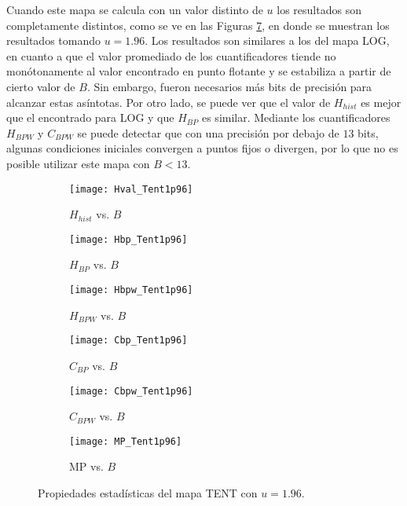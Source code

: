 Cuando este mapa se calcula con un valor distinto de $u$ los resultados son completamente distintos, como se ve en las Figuras \ref{fig:TENT1p96_QuantiB}, en donde se muestran los resultados tomando $u=1.96$.
Los resultados son similares a los del mapa LOG, en cuanto a que el valor promediado de los cuantificadores tiende no monótonamente al valor encontrado en punto flotante y se estabiliza a partir de cierto valor de $B$.
Sin embargo, fueron necesarios más bits de precisión para alcanzar estas asíntotas.
Por otro lado, se puede ver que el valor de $H_{hist}$ es mejor que el encontrado para LOG y que $H_{BP}$ es similar.
Mediante los cuantificadores $H_{BPW}$ y $C_{BPW}$ se puede detectar que con una precisión por debajo de $13$ bits, algunas condiciones iniciales convergen a puntos fijos o divergen, por lo que no es posible utilizar este mapa con $B < 13$.
%
\begin{figure}[htpb]
	\centering
	\begin{subfigure}[b]{0.49\textwidth}
		\texttt{[image: Hval\_Tent1p96]}
		\caption{$H_{hist}$ vs. $B$}
		\label{fig:Hval_Tent1p96}
	\end{subfigure}
	\begin{subfigure}[b]{0.49\textwidth}
		\texttt{[image: Hbp\_Tent1p96]}
		\caption{$H_{BP}$ vs. $B$}
		\label{fig:Hbp_Tent1p96}
	\end{subfigure}
	\begin{subfigure}[b]{0.49\textwidth}
		\texttt{[image: Hbpw\_Tent1p96]}
		\caption{$H_{BPW}$ vs. $B$}
		\label{fig:Hbpw_Tent1p96}
	\end{subfigure}
	\begin{subfigure}[b]{0.49\textwidth}
		\texttt{[image: Cbp\_Tent1p96]}
		\caption{$C_{BP}$ vs. $B$}
		\label{fig:Cbp_Tent1p96}
	\end{subfigure}
	\begin{subfigure}[b]{0.49\textwidth}
		\texttt{[image: Cbpw\_Tent1p96]}
		\caption{$C_{BPW}$ vs. $B$}
		\label{fig:Cbpw_Tent1p96}
	\end{subfigure}
	\begin{subfigure}[b]{0.49\textwidth}
		\texttt{[image: MP\_Tent1p96]}
		\caption{MP vs. $B$}
		\label{fig:MP_Tent1p96}
	\end{subfigure}
	\caption{Propiedades estadísticas del mapa TENT con $u=1.96$.}
	\label{fig:TENT1p96_QuantiB}
\end{figure}

